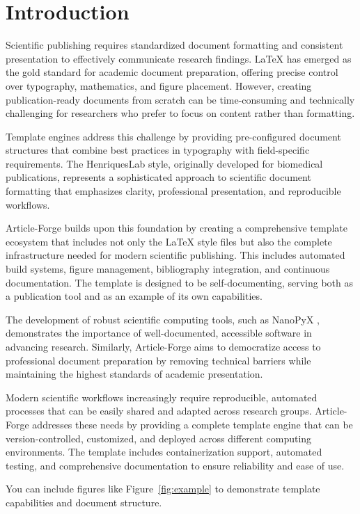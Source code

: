 \section{Introduction}

Scientific publishing requires standardized document formatting and consistent presentation to effectively communicate research findings. LaTeX has emerged as the gold standard for academic document preparation, offering precise control over typography, mathematics, and figure placement. However, creating publication-ready documents from scratch can be time-consuming and technically challenging for researchers who prefer to focus on content rather than formatting.

Template engines address this challenge by providing pre-configured document structures that combine best practices in typography with field-specific requirements. The HenriquesLab style, originally developed for biomedical publications, represents a sophisticated approach to scientific document formatting that emphasizes clarity, professional presentation, and reproducible workflows.

Article-Forge builds upon this foundation by creating a comprehensive template ecosystem that includes not only the LaTeX style files but also the complete infrastructure needed for modern scientific publishing. This includes automated build systems, figure management, bibliography integration, and continuous documentation. The template is designed to be self-documenting, serving both as a publication tool and as an example of its own capabilities.

The development of robust scientific computing tools, such as NanoPyX \cite{nanopyx2024}, demonstrates the importance of well-documented, accessible software in advancing research. Similarly, Article-Forge aims to democratize access to professional document preparation by removing technical barriers while maintaining the highest standards of academic presentation.

Modern scientific workflows increasingly require reproducible, automated processes that can be easily shared and adapted across research groups. Article-Forge addresses these needs by providing a complete template engine that can be version-controlled, customized, and deployed across different computing environments. The template includes containerization support, automated testing, and comprehensive documentation to ensure reliability and ease of use.

You can include figures like Figure~\ref{fig:example} to demonstrate template capabilities and document structure.

